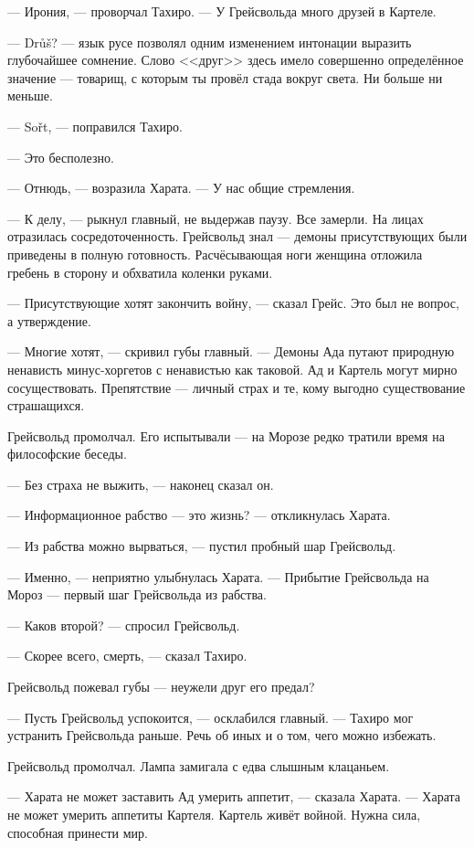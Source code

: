 --- Ирония, --- проворчал Тахиро.
--- У Грейсвольда много друзей в Картеле.

--- Dr\r{u}\v{s}? --- язык русе позволял одним изменением интонации выразить глубочайшее сомнение.
Слово <<друг>> здесь имело совершенно определённое значение --- товарищ, с которым ты провёл стада вокруг света.
Ни больше ни меньше.

--- So\v{r}t\FM, --- поправился Тахиро.

--- Это бесполезно.

--- Отнюдь, --- возразила Харата.
--- У нас общие стремления.

--- К делу, --- рыкнул главный, не выдержав паузу.
Все замерли.
На лицах отразилась сосредоточенность.
Грейсвольд знал --- демоны присутствующих были приведены в полную готовность.
Расчёсывающая ноги женщина отложила гребень в сторону и обхватила коленки руками.

--- Присутствующие хотят закончить войну, --- сказал Грейс.
Это был не вопрос, а утверждение.

--- Многие хотят, --- скривил губы главный.
--- Демоны Ада путают природную ненависть минус-хоргетов с ненавистью как таковой.
Ад и Картель могут мирно сосуществовать.
Препятствие --- личный страх и те, кому выгодно существование страшащихся.

Грейсвольд промолчал.
Его испытывали --- на Морозе редко тратили время на философские беседы.

--- Без страха не выжить, --- наконец сказал он.

--- Информационное рабство --- это жизнь? --- откликнулась Харата.

--- Из рабства можно вырваться, --- пустил пробный шар Грейсвольд.

--- Именно, --- неприятно улыбнулась Харата.
--- Прибытие Грейсвольда на Мороз --- первый шаг Грейсвольда из рабства.

--- Каков второй? --- спросил Грейсвольд.

--- Скорее всего, смерть, --- сказал Тахиро.

Грейсвольд пожевал губы --- неужели друг его предал?

--- Пусть Грейсвольд успокоится, --- осклабился главный.
--- Тахиро мог устранить Грейсвольда раньше.
Речь об иных и о том, чего можно избежать.

Грейсвольд промолчал.
Лампа замигала с едва слышным клацаньем.

--- Харата не может заставить Ад умерить аппетит, --- сказала Харата.
--- Харата не может умерить аппетиты Картеля.
Картель живёт войной.
Нужна сила, способная принести мир.

